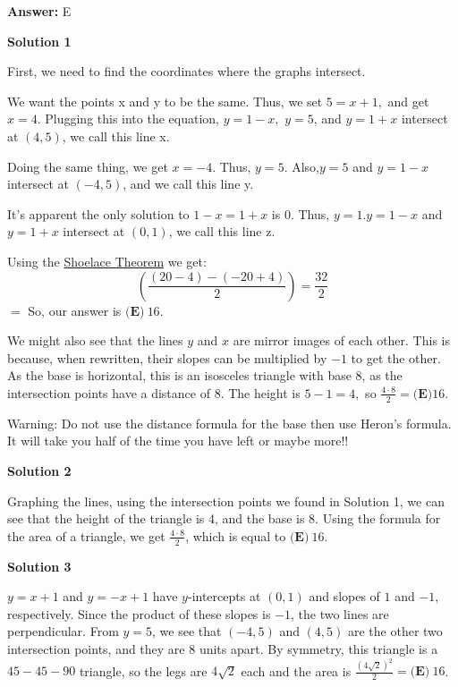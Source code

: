\begin{enumerate}
 \textbf{Answer: }E



\textbf{Solution 1}

First, we need to find the coordinates where the graphs intersect. 

 We want the points x and y to be the same. Thus, we set $5=x+1,$ and get $x=4.$ Plugging this into the equation, $y=1-x,$ $y=5$, and $y=1+x$ intersect at $(4,5)$, we call this line x.

 Doing the same thing, we get $x=-4.$ Thus, $y=5$. Also,$y=5$ and $y=1-x$ intersect at $(-4,5)$, and we call this line y.

 It's apparent the only solution to $1-x=1+x$ is $0.$ Thus, $y=1.$$y=1-x$ and $y=1+x$ intersect at $(0,1)$, we call this line z.

 Using the \href{https://artofproblemsolving.com/wiki/index.php?title=Shoelace\_Theorem}{Shoelace Theorem} we get: 
 \[\left(\frac{(20-4)-(-20+4)}{2}\right)=\frac{32}{2}\] $=$ So, our answer is $\boxed{\textbf{(E)}\ 16.}$

 We might also see that the lines $y$ and $x$ are mirror images of each other. This is because, when rewritten, their slopes can be multiplied by $-1$ to get the other. As the base is horizontal, this is an isosceles triangle with base 8, as the intersection points have a distance of 8. The height is $5-1=4,$ so $\frac{4\cdot 8}{2} = \boxed{\textbf{(E)} 16.}$

 Warning: Do not use the distance formula for the base then use Heron's formula. It will take you half of the time you have left or maybe more!!

 



\textbf{Solution 2}

Graphing the lines, using the intersection points we found in Solution 1, we can see that the height of the triangle is 4, and the base is 8. Using the formula for the area of a triangle, we get $\frac{4\cdot8}{2}$, which is equal to $\boxed{\textbf{(E)}\ 16}$.

 



\textbf{Solution 3}

$y = x + 1$ and $y = -x + 1$ have $y$-intercepts at $(0, 1)$ and slopes of $1$ and $-1$, respectively. Since the product of these slopes is $-1$, the two lines are perpendicular. From $y = 5$, we see that $(-4, 5)$ and $(4, 5)$ are the other two intersection points, and they are $8$ units apart. By symmetry, this triangle is a $45-45-90$ triangle, so the legs are $4\sqrt{2}$ each and the area is $\frac{(4\sqrt{2})^2}{2} = \boxed{\textbf{(E)}\ 16}$.


\end{enumerate}
